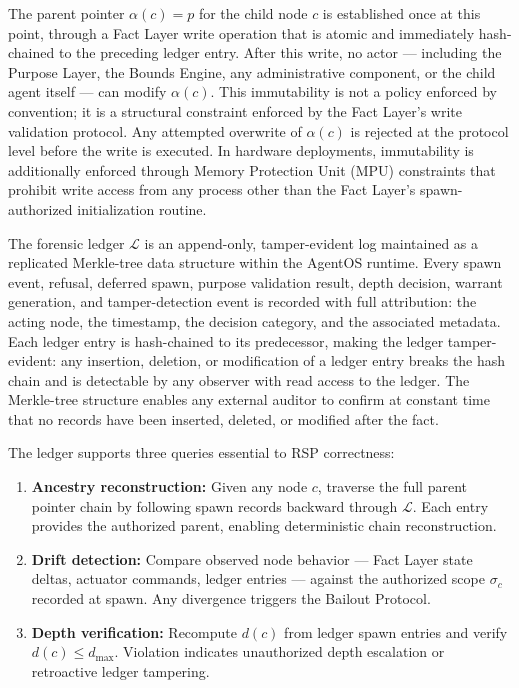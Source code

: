 The parent pointer $\alpha(c) = p$ for the child node $c$ is established once at this point, through a Fact Layer write operation that is atomic and immediately hash-chained to the preceding ledger entry. After this write, no actor — including the Purpose Layer, the Bounds Engine, any administrative component, or the child agent itself — can modify $\alpha(c)$. This immutability is not a policy enforced by convention; it is a structural constraint enforced by the Fact Layer's write validation protocol. Any attempted overwrite of $\alpha(c)$ is rejected at the protocol level before the write is executed. In hardware deployments, immutability is additionally enforced through Memory Protection Unit (MPU) constraints that prohibit write access from any process other than the Fact Layer's spawn-authorized initialization routine.

The forensic ledger $\mathcal{L}$ is an append-only, tamper-evident log maintained as a replicated Merkle-tree data structure within the AgentOS runtime. Every spawn event, refusal, deferred spawn, purpose validation result, depth decision, warrant generation, and tamper-detection event is recorded with full attribution: the acting node, the timestamp, the decision category, and the associated metadata. Each ledger entry is hash-chained to its predecessor, making the ledger tamper-evident: any insertion, deletion, or modification of a ledger entry breaks the hash chain and is detectable by any observer with read access to the ledger. The Merkle-tree structure enables any external auditor to confirm at constant time that no records have been inserted, deleted, or modified after the fact.

The ledger supports three queries essential to RSP correctness:

\begin{enumerate}
    \itemsep0em
    \item \textbf{Ancestry reconstruction:} Given any node $c$, traverse the full parent pointer chain by following spawn records backward through $\mathcal{L}$. Each entry provides the authorized parent, enabling deterministic chain reconstruction.
    \item \textbf{Drift detection:} Compare observed node behavior — Fact Layer state deltas, actuator commands, ledger entries — against the authorized scope $\sigma_c$ recorded at spawn. Any divergence triggers the Bailout Protocol.
    \item \textbf{Depth verification:} Recompute $d(c)$ from ledger spawn entries and verify $d(c) \leq d_{\max}$. Violation indicates unauthorized depth escalation or retroactive ledger tampering.
\end{enumerate}

